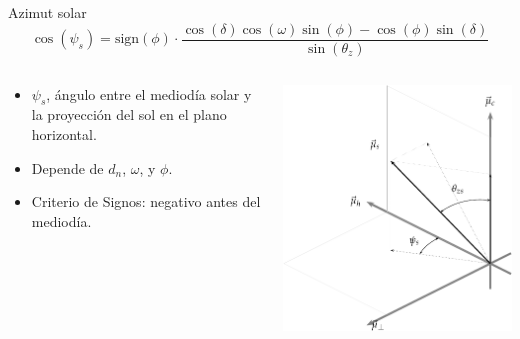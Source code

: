 \documentclass[xcolor={usenames,svgnames,dvipsnames}]{beamer}
\begin{document}
\begin{frame}[plain,label={sec:org100331a}]{Azimut solar}
\[
  \cos(\psi_{s}) = \mathrm{sign}(\phi) \cdot \frac{\cos(\delta) \cos(\omega) \sin(\phi) - \cos(\phi) \sin(\delta)} {\sin(\theta_{z})}
\]
\begin{columns}
\begin{column}{0.55\columnwidth}
\begin{itemize}
\item \(\psi_s\), ángulo entre el mediodía solar y la proyección del sol en el plano horizontal.
\item Depende de \(d_n\), \(\omega\), y \(\phi\).
\item Criterio de Signos: negativo antes del mediodía.
\end{itemize}
\end{column}

\begin{column}{0.7\columnwidth}
\begin{center}
\includegraphics[width=.9\linewidth]{../figs/SistemaCoordenadasLocal-crop.pdf}
\end{center}
\end{column}
\end{columns}
\end{frame}
\end{document}
